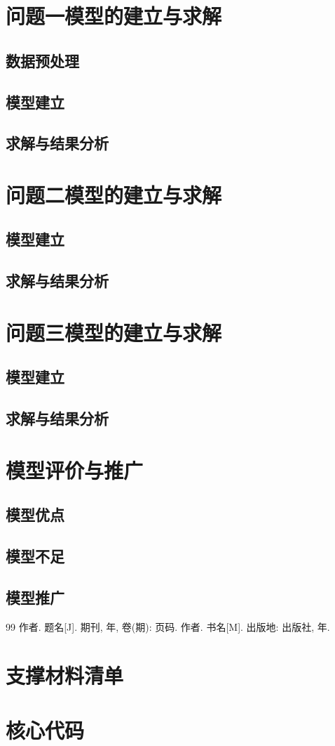 \documentclass{MathorCupBigData}
\begin{document}
\section{问题一模型的建立与求解}
\subsection{数据预处理}
\subsection{模型建立}
\subsection{求解与结果分析}

\section{问题二模型的建立与求解}
\subsection{模型建立}
\subsection{求解与结果分析}

\section{问题三模型的建立与求解}
\subsection{模型建立}
\subsection{求解与结果分析}

\section{模型评价与推广}
\subsection{模型优点}
\subsection{模型不足}
\subsection{模型推广}

\begin{thebibliography}{99}
 作者. 题名[J]. 期刊, 年, 卷(期): 页码.
 作者. 书名[M]. 出版地: 出版社, 年.
\end{thebibliography}

\appendix
\section{支撑材料清单}
\section{核心代码}
% 
\end{document}
